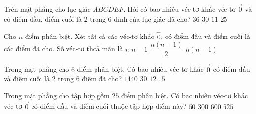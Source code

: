 \begin{ex}%
	Trên mặt phẳng cho lục giác $ABCDEF$. Hỏi có  bao nhiêu véc-tơ khác véc-tơ $\overrightarrow 0 $ và có điểm đầu, điểm cuối là 2 trong 6 đỉnh của lục giác đã cho?
	\choice 
		{$36$} 
		 {\True $30$}
		{$11$} 
		{$25$} 
\end{ex}

\begin{ex}%
	Cho $n$ điểm phân biệt. Xét tất cả các véc-tơ  khác $\overrightarrow{0}$, có điểm đầu và điểm cuối là các điểm đã cho. Số véc-tơ thoả mãn là
	 \choice
		 {$n$}
		{$n-1$} 
		{$\dfrac{n(n-1)}{2}$} 
		 {\True $n(n-1)$}
\end{ex}

\begin{ex}%
	 Trong mặt phẳng cho $6$ điểm phân biệt. Có bao nhiêu véc-tơ khác $\overrightarrow{0}$ có điểm đầu và điểm cuối là $2$ trong $6$ điểm đã cho?
	 \choice
		 {$1440$}
		 {\True $30$}
		{$12$} 
		 {$15$}
\end{ex}

\begin{ex}%
	Trong mặt phẳng cho tập hợp gồm $25$ điểm phân biệt. Có bao nhiêu véc-tơ khác véc-tơ $\overrightarrow{0}$ có điểm đầu và điểm cuối thuộc  tập hợp điểm này?
	\choice 
		 {$50$}
		 {$300$}
		{\True $600$} 
		{$625$} 
\end{ex}

